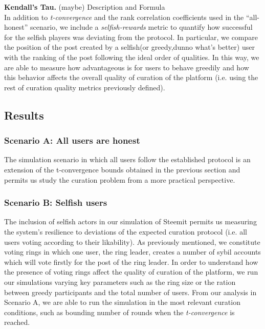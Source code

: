 \textbf{Kendall's Tau.} (maybe) Description and Formula\\



In addition to \textit{t-convergence} and the rank correlation coefficients used in the ``all-honest'' scenario, we include a \textit{selfish-rewards} metric to quantify how successful for the selfish players was deviating from the protocol. 
In particular, we compare the position of the post created by a selfish(or greedy,dunno what's better) user with the ranking of the post following the ideal order of qualities. In this way, we are able to measure how advantageous is for users to behave greedily and how this behavior affects the overall quality of curation of the platform (i.e. using the rest of curation quality metrics previously defined).


\subsection{Results}

\subsubsection*{Scenario A: All users are honest}

The simulation scenario in which all users follow the established protocol is an extension of the t-convergence bounds obtained in the previous section and permits us study the curation problem from a more practical perspective.


\subsubsection{Scenario B: Selfish users}

The inclusion of selfish actors in our simulation of Steemit permits us measuring the system's resilience to deviations of the expected curation protocol (i.e. all users voting according to their likability).
As previously mentioned, we constitute voting rings in which one user, the ring leader, creates a number of sybil accounts which will vote firstly for the post of the ring leader.
In order to understand how the presence of voting rings affect the quality of curation of the platform, we run our simulations varying key parameters such as the ring size or the ration between greedy participants and the total number of users.
From our analysis in Scenario A, we are able to run the simulation in the most relevant curation conditions, such as bounding number of rounds when the \textit{t-convergence} is reached.











